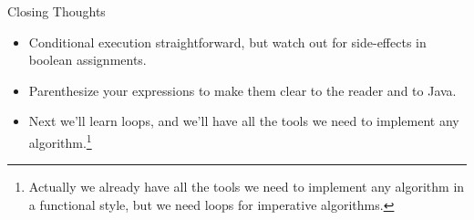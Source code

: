 \documentclass{beamer}
\begin{document}
\begin{frame}[fragile]{Closing Thoughts}


\begin{itemize}
\item Conditional execution straightforward, but watch out for side-effects in boolean assignments.
\item Parenthesize your expressions to make them clear to the reader and to Java.
\item Next we'll learn loops, and we'll have all the tools we need to implement any algorithm.\footnote{Actually we already have all the tools we need to implement any algorithm in a functional style, but we need loops for imperative algorithms.}
\end{itemize}


\end{frame}
\end{document}
